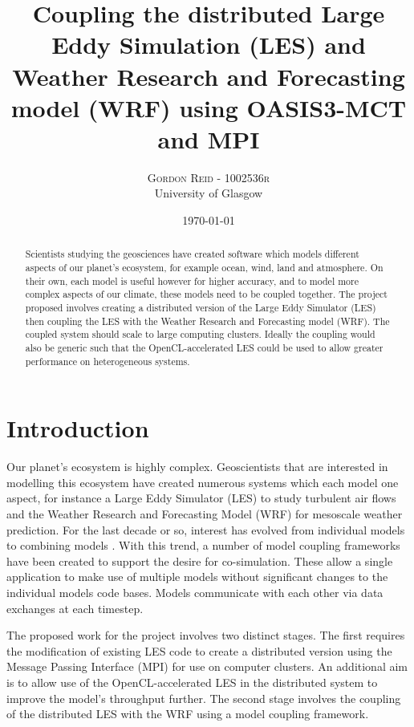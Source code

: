 \documentclass[a4paper,twocolumn,10pt]{article}
\title{Coupling the distributed Large Eddy Simulation (LES) and Weather
Research and Forecasting model (WRF) using OASIS3-MCT and MPI}
\author{\large\textsc{Gordon Reid - 1002536r}\\University of Glasgow}
\date{\today}
\begin{document}
\setlength{\parskip}{0.3cm}

\maketitle

\begin{abstract}

Scientists studying the geosciences have created software which models different
aspects of our planet's ecosystem, for example ocean, wind, land and atmosphere.
On their own, each model is useful however for higher accuracy, and to model
more complex aspects of our climate, these models need to be coupled together.
The project proposed involves creating a distributed version of the Large Eddy
Simulator (LES) then coupling the LES with the Weather Research and Forecasting
model (WRF). The coupled system should scale to large computing clusters.
Ideally the coupling would also be generic such that the OpenCL-accelerated LES
could be used to allow greater performance on heterogeneous systems.

\end{abstract}

\section*{Introduction}

Our planet's ecosystem is highly complex. Geoscientists that are interested in
modelling this ecosystem have created numerous systems which each model one
aspect, for instance a Large Eddy Simulator (LES) to study turbulent air flows
\cite{Nakayama2011,Nakayama2012} and the Weather Research and Forecasting Model
(WRF) for mesoscale weather prediction. For the last decade or so, interest has
evolved from individual models to combining models \cite{Michalakes2010}. With
this trend, a number of model coupling frameworks have been created to support
the desire for co-simulation. These allow a single application to make use of
multiple models without significant changes to the individual models code bases.
Models communicate with each other via data exchanges at each timestep.

The proposed work for the project involves two distinct stages. The first
requires the modification of existing LES code to create a distributed version
using the Message Passing Interface (MPI) for use on computer clusters. An
additional aim is to allow use of the OpenCL-accelerated LES
\cite{Vanderbauwhede2014} in the distributed system to improve the model's
throughput further. The second stage involves the coupling of the distributed
LES with the WRF using a model coupling framework.
\end{document}
